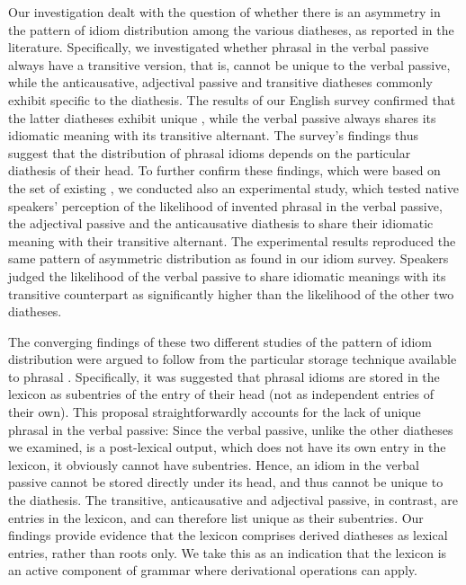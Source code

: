\documentclass[output=paper]{langsci/langscibook}
\begin{document}
Our investigation dealt with the question of whether there is an asymmetry in
the pattern of idiom distribution among the various diatheses, as reported in
the literature. Specifically, we investigated whether phrasal  in the
verbal passive always have a transitive version, that is, cannot be unique to
the verbal passive, while the anticausative, adjectival passive and transitive
diatheses commonly exhibit  specific to the diathesis. The results of our
English survey confirmed that the latter diatheses exhibit unique , while
the verbal passive always shares its idiomatic meaning with its transitive
alternant. The survey’s findings thus suggest that the distribution of phrasal
idioms depends on the particular diathesis of their head. To further confirm
these findings, which were based on the set of existing , we conducted
also an experimental study, which tested native speakers’ perception of the
likelihood of invented phrasal  in the verbal passive, the adjectival
passive and the anticausative diathesis to share their idiomatic meaning with
their transitive alternant. The experimental results reproduced the same
pattern of asymmetric distribution as found in our idiom survey. Speakers
judged the likelihood of the verbal passive to share idiomatic meanings with
its transitive counterpart as significantly higher than the likelihood of the
other two diatheses.

The converging findings of these two different studies of the pattern of idiom
distribution were argued to follow from the particular storage technique
available to phrasal . Specifically, it was suggested that phrasal idioms
are stored in the lexicon as subentries of the entry of their head (not as
independent entries of their own). This proposal straightforwardly accounts for
the lack of unique phrasal  in the verbal passive: Since the verbal
passive, unlike the other diatheses we examined, is a post-lexical output,
which does not have its own entry in the lexicon, it obviously cannot have
subentries. Hence, an idiom in the verbal passive cannot be stored directly
under its head, and thus cannot be unique to the diathesis. The transitive,
anticausative and adjectival passive, in contrast, are entries in the lexicon,
and can therefore list unique  as their subentries. Our findings provide
evidence that the lexicon comprises derived diatheses as lexical entries,
rather than roots only. We take this as an indication that the lexicon is an
active component of grammar where derivational operations can apply.
\end{document}
